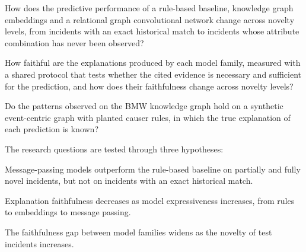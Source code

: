 \begin{description}[%
  style=nextline,
  leftmargin=0pt,
  labelsep=0pt,
  font=\normalfont\bfseries,
  itemsep=0.5\baselineskip,
  topsep=\smallskipamount
]
  \item[SQ1 -- Generalization]
    How does the predictive performance of a rule-based baseline, knowledge
    graph embeddings and a relational graph convolutional network change
    across novelty levels, from incidents with an exact historical match to
    incidents whose attribute combination has never been observed?

  \item[SQ2 -- Faithfulness]
    How faithful are the explanations produced by each model family,
    measured with a shared protocol that tests whether the cited evidence is
    necessary and sufficient for the prediction, and how does their
    faithfulness change across novelty levels?

  \item[SQ3 -- Validity]
    Do the patterns observed on the BMW knowledge graph hold on a synthetic
    event-centric graph with planted causer rules, in which the true
    explanation of each prediction is known?
\end{description}

The research questions are tested through three hypotheses:

\begin{description}[%
  style=nextline,
  leftmargin=0pt,
  labelsep=0pt,
  font=\normalfont\bfseries,
  itemsep=0.4\baselineskip,
  topsep=\smallskipamount
]
  \item[H1]
    Message-passing models outperform the rule-based baseline on partially
    and fully novel incidents, but not on incidents with an exact historical
    match.

  \item[H2]
    Explanation faithfulness decreases as model expressiveness increases,
    from rules to embeddings to message passing.

  \item[H3]
    The faithfulness gap between model families widens as the novelty of
    test incidents increases.
\end{description}
